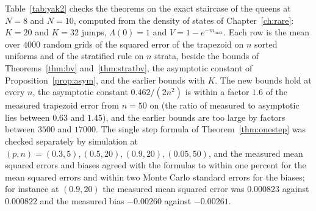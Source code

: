 Table~\ref{tab:yak2} checks the theorems on the exact staircase of the queens at $N = 8$ and $N = 10$, computed from the density of states of Chapter~\ref{ch:rare}: $K = 20$ and $K = 32$ jumps, $\Lambda(0) = 1$ and $V = 1 - e^{-m_{\max}}$. Each row is the mean over $4000$ random grids of the squared error of the trapezoid on $n$ sorted uniforms and of the stratified rule on $n$ strata, beside the bounds of Theorems~\ref{thm:bv} and~\ref{thm:stratbv}, the asymptotic constant of Proposition~\ref{prop:asym}, and the earlier bounds with $K$. The new bounds hold at every $n$, the asymptotic constant $0.462 / (2 n^2)$ is within a factor $1.6$ of the measured trapezoid error from $n = 50$ on (the ratio of measured to asymptotic lies between $0.63$ and $1.45$), and the earlier bounds are too large by factors between $3500$ and $17000$. The single step formula of Theorem~\ref{thm:onestep} was checked separately by simulation at $(p, n) = (0.3, 5), (0.5, 20), (0.9, 20), (0.05, 50)$, and the measured mean squared errors and biases agreed with the formulas to within one percent for the mean squared errors and within two Monte Carlo standard errors for the biases; for instance at $(0.9, 20)$ the measured mean squared error was $0.000823$ against $0.000822$ and the measured bias $-0.00260$ against $-0.00261$.

